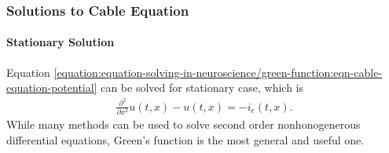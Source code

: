 \documentclass[letterpaper,10pt,english]{sphinxmanual}
\begin{document}
\subsubsection{Solutions to Cable Equation}
\label{\detokenize{equation-solving-in-neuroscience/green-function:solutions-to-cable-equation}}

\paragraph{Stationary Solution}
\label{\detokenize{equation-solving-in-neuroscience/green-function:stationary-solution}}
Equation \eqref{equation:equation-solving-in-neuroscience/green-function:eqn-cable-equation-potential} can be solved for stationary case, which is
\label{\detokenize{equation-solving-in-neuroscience/green-function:equation-eqn-cable-equation-stationary-equation-potential}}\begin{equation}\label{equation:equation-solving-in-neuroscience/green-function:eqn-cable-equation-stationary-equation-potential}
\begin{split}\frac{\partial^2}{\partial x^2} u(t,x) - u(t,x) =- i_{e}(t,x) .\end{split}
\end{equation}
While many methods can be used to solve second order nonhonogenerous differential equations, Green’s function is the most general and useful one.
\end{document}
